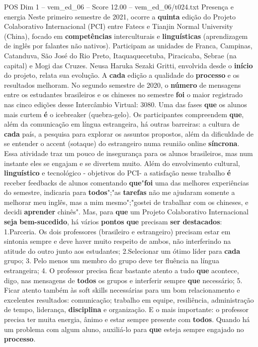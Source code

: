 \begin{textsample}{POS Dim 1 – vem\_ed\_06 – Score 12.00 – vem\_ed\_06/t024.txt}  \label{ex:f1_pos_128}
Presença e energia Neste primeiro semestre de 2021, ocorre a \textbf{quinta} edição do Projeto Colaborativo Internacional (PCI) entre Fatecs e Tianjin Normal University (China), focado em \textbf{competências} interculturais e \textbf{linguísticas} (aprendizagem de inglês por falantes não nativos).
Participam as unidades de Franca, Campinas, Catanduva, São José do Rio Preto, Itaquaquecetuba, Piracicaba, Sebrae (na capital) e Mogi das Cruzes.
Neusa Haruka Sezaki Gritti, envolvida desde o \textbf{início} do projeto, relata sua evolução.
A \textbf{cada} edição a qualidade do \textbf{processo} e os resultados melhoram.
No segundo semestre de 2020, o \textbf{número} de mensagens entre os estudantes brasileiros e os chineses no semestre \textbf{foi} o maior registrado nas cinco edições desse Intercâmbio Virtual: 3080.
Uma das fases \textbf{que} os alunos mais curtem \textbf{é} o icebreaker (quebra-gelo).
Os participantes compreendem \textbf{que}, além da comunicação em língua estrangeira, há outras barreiras: a cultura de \textbf{cada} país, a pesquisa para explorar os assuntos propostos, além da dificuldade de se entender o accent (sotaque) do estrangeiro numa reunião online \textbf{síncrona}.
Essa atividade traz um pouco de insegurança para os alunos brasileiros, mas num instante eles se engajam e se divertem muito.
Além do envolvimento cultural, \textbf{linguístico} e tecnológico - objetivos do PCI- a satisfação nesse trabalho \textbf{é} receber feedbacks de alunos comentando \textbf{que}"\textbf{foi} uma das melhores experiências do semestre, indicaria para \textbf{todos}";"as \textbf{tarefas} não me ajudaram somente a melhorar meu inglês, mas a mim mesmo";"gostei de trabalhar com os chineses, e decidi \textbf{aprender} chinês".
Mas, para \textbf{que} um Projeto Colaborativo Internacional \textbf{seja} \textbf{bem-sucedido}, há vários \textbf{pontos} \textbf{que} precisam \textbf{ser} \textbf{destacados}: 1.Parceria.
Os dois professores (brasileiro e estrangeiro) precisam estar em sintonia sempre e deve haver muito respeito de ambos, não interferindo na atitude do outro junto aos estudantes; 2.Selecionar um ótimo líder para \textbf{cada} grupo; 3.
Pelo menos um membro do grupo deve ter fluência na língua estrangeira; 4.
O professor precisa ficar bastante atento a tudo \textbf{que} acontece, digo, nas mensagens de \textbf{todos} os grupos e interferir sempre \textbf{que} necessário; 5.
Ficar atento também às soft skills necessárias para um bom relacionamento e excelentes resultados: comunicação; trabalho em equipe, resiliência, administração de tempo, liderança, \textbf{disciplina} e organização.
E o mais importante: o professor precisa ter muita energia, ânimo e estar sempre presente com \textbf{todos}.
Quando há um problema com algum aluno, auxiliá-lo para \textbf{que} esteja sempre engajado no \textbf{processo}.

\end{textsample}
